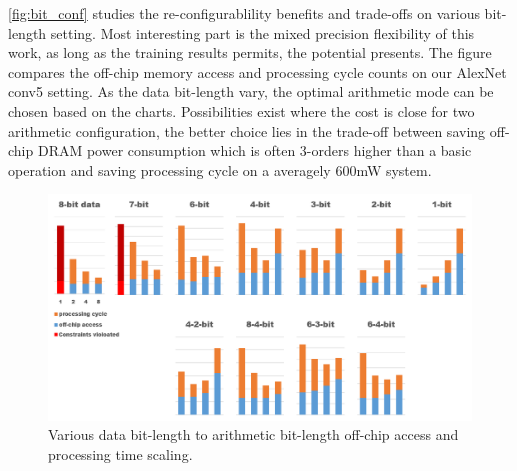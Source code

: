 \begin{table}[h]
    \caption{Performance summary Batch=4}
    \label{tab:perf_sum}
    \centering
    \footnotesize 
\end{table}
\autoref{fig:bit_conf} studies the re-configurablility benefits and trade-offs on various bit-length setting. Most interesting part is the mixed precision flexibility of this work, as long as the training results permits, the potential presents. The figure compares the off-chip memory access and processing cycle counts on our AlexNet conv5 setting. As the data bit-length vary, the optimal arithmetic mode can be chosen based on the charts. Possibilities exist where the cost is close for two arithmetic configuration, the better choice lies in the trade-off between saving off-chip DRAM power consumption which is often 3-orders higher than a basic operation and saving processing cycle on a averagely 600mW system.
\begin{figure}[h]
    \centering
    \includegraphics[width=1\linewidth]{inc/5_results/figure/bit_conf.png}
    \caption{Various data bit-length to arithmetic bit-length off-chip access and processing time scaling.}
    \label{fig:bit_conf}
\end{figure}


